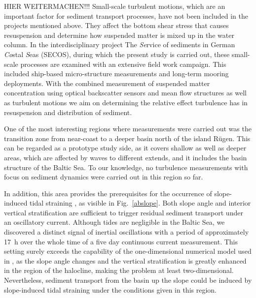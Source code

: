 HIER WEITERMACHEN!!! Small-scale turbulent motions, which are an important 
factor for sediment 
transport processes, have not been included in the projects mentioned above. 
They affect the bottom shear stress that causes resuspension and determine how 
suspended matter is mixed up in the water column. In the interdisciplinary 
project The \textit{Se}rvice of sediments in German \textit{Co}stal 
\textit{S}eas (SECOS), during which the present study is carried out, these 
small-scale processes are examined with an extensive field work campaign. This 
included ship-based micro-structure measurements and long-term mooring 
deployments. With the combined measurement of suspended matter concentration 
using optical backscatter sensors and mean flow structures as well as turbulent 
motions we aim on determining the relative effect turbulence has in 
resuspension and distribution of sediment. 

One of the most interesting regions where measurements were carried out was the 
transition zone from near-coast to a deeper basin north of the island 
R\"{u}gen. This can be regarded as a prototype study side, as it covers shallow 
as well as deeper areas, which are affected by waves to different extends, and 
it includes the basin structure of the Baltic Sea. To our knowledge, 
no turbulence measurements with focus on sediment dynamics were carried out in 
this region so far.
 
In addition, this area provides the prerequisites for the occurrence of 
slope-induced tidal straining \citep[][]{UmlaufBurchard2011a, 
schulzumlauf2016}, as visible in Fig.\ \ref{abslope}. Both slope angle and 
interior vertical stratification are sufficient to trigger residual sediment 
transport under an oscillatory current. Although tides are negligible in the 
Baltic Sea, we discovered a distinct signal of inertial oscillations with a 
period of approximately 17~h over the whole time of a five day continuous 
current measurement. This setting surely exceeds the capability of the 
one-dimensional numerical model used in \cite{schulzumlauf2016}, as the slope 
angle changes and the vertical stratification is greatly enhanced in the 
region of the halocline, making the problem at least two-dimensional. 
Nevertheless, sediment transport from the basin up the slope could be induced 
by slope-induced tidal straining under the conditions given in this region.

